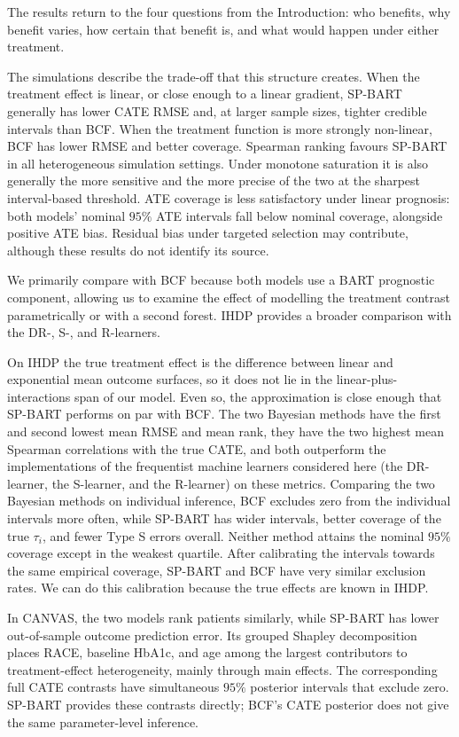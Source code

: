 \documentclass[12pt]{article}
\newcommand{\rev}[1]{\ifdefined\ReviewChanges{\color{revisionblue}#1}\else#1\fi}
\begin{document}
The results return to the four questions from the Introduction: who benefits, why benefit varies, how certain that benefit is, and what would happen under either treatment.

The simulations describe the trade-off that this structure creates. When the treatment effect is linear, or close enough to a linear gradient, \rev{SP-BART} generally has lower CATE RMSE and, at larger sample sizes, tighter credible intervals than BCF. When the treatment function is more strongly non-linear, BCF has lower RMSE and better coverage. Spearman ranking favours \rev{SP-BART} in all heterogeneous simulation settings. Under monotone saturation it is also generally the more sensitive and the more precise of the two at the sharpest interval-based threshold. ATE coverage is less satisfactory under linear prognosis: both models' nominal $95\%$ ATE intervals fall below nominal coverage, alongside positive ATE bias. Residual bias under targeted selection may contribute, although these results do not identify its source.

We primarily compare with BCF because both models use a BART prognostic component, allowing us to examine the effect of modelling the treatment contrast parametrically or with a second forest. IHDP provides a broader comparison with the DR-, S-, and R-learners.

On IHDP the true treatment effect is the difference between linear and exponential mean outcome surfaces, so it does not lie in the linear-plus-interactions span of our model. Even so, the approximation is close enough that \rev{SP-BART} performs on par with BCF. The two Bayesian methods have the first and second lowest mean RMSE and mean rank, they have the two highest mean Spearman correlations with the true CATE, and both outperform the implementations of the frequentist machine learners considered here (the DR-learner, the S-learner, and the R-learner) on these metrics. Comparing the two Bayesian methods on individual inference, BCF excludes zero from the individual intervals more often, while \rev{SP-BART} has wider intervals, better coverage of the true $\tau_i$, and fewer Type S errors overall. Neither method attains the nominal $95\%$ coverage except in the weakest quartile. After calibrating the intervals towards the same empirical coverage, \rev{SP-BART} and BCF have very similar exclusion rates. We can do this calibration because the true effects are known in IHDP.

In CANVAS, the two models rank patients similarly, while \rev{SP-BART} has lower out-of-sample outcome prediction error. Its grouped Shapley decomposition places RACE, baseline HbA1c, and age among the largest contributors to treatment-effect heterogeneity, mainly through main effects. The corresponding full CATE contrasts have simultaneous $95\%$ posterior intervals that exclude zero. \rev{SP-BART} provides these contrasts directly; BCF's CATE posterior does not give the same parameter-level inference.
\end{document}
